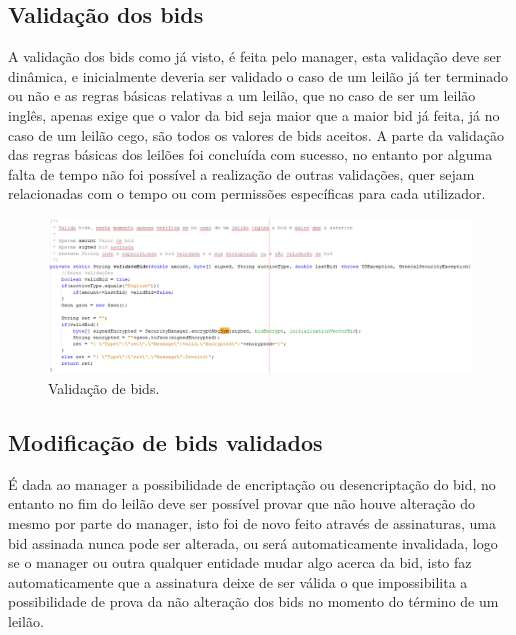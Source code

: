 \documentclass[pdftex,12pt,a4paper]{report}
\begin{document}
\subsection{Validação dos bids}
A validação dos bids como já visto, é feita pelo manager, esta validação deve ser dinâmica, e inicialmente deveria ser validado o caso de um leilão já ter terminado ou não e as regras básicas relativas a um leilão, que no caso de ser um leilão inglês, apenas exige que o valor da bid seja maior que a maior bid já feita, já no caso de um leilão cego, são todos os valores de bids aceitos.
A parte da validação das regras básicas dos leilões foi concluída com sucesso, no entanto por alguma falta de tempo não foi possível a realização de outras validações, quer sejam relacionadas com o tempo ou com permissões específicas para cada utilizador.
\begin{figure}[h]
    \centering
    \includegraphics[width=17.0cm]{valid.png}
    \caption{Validação de bids.}
    \label{fig:mesh1}
\end{figure}

\subsection{Modificação de bids validados}
É dada ao manager a possibilidade de encriptação ou desencriptação do bid, no entanto no fim do leilão deve ser possível provar que não houve alteração do mesmo por parte do manager, isto foi de novo feito através de assinaturas, uma bid assinada nunca pode ser alterada, ou será automaticamente invalidada, logo se o manager ou outra qualquer entidade mudar algo acerca da bid, isto faz automaticamente que a assinatura deixe de ser válida o que impossibilita a possibilidade de prova da não alteração dos bids no momento do término de um leilão.
\end{document}
